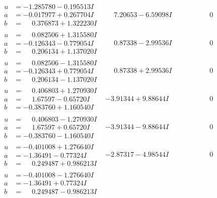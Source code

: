 \documentclass[1p]{elsarticle_modified}
\theoremstyle{definition}
\begin{document}
$$\begin{array}{c|c|c}
\begin{aligned}
u &= -1.285780 - 0.195513 I \\
a &= -0.017977 + 0.267704 I \\
b &= \phantom{-}0.376873 + 1.322230 I\end{aligned}
 & \phantom{-}7.20653 - 6.59098 I & \phantom{-0.000000 } 0 \\ \hline\begin{aligned}
u &= \phantom{-}0.082506 + 1.315580 I \\
a &= -0.126343 - 0.779054 I \\
b &= \phantom{-}0.206134 + 1.137020 I\end{aligned}
 & \phantom{-}0.87338 - 2.99536 I & \phantom{-0.000000 } 0 \\ \hline\begin{aligned}
u &= \phantom{-}0.082506 - 1.315580 I \\
a &= -0.126343 + 0.779054 I \\
b &= \phantom{-}0.206134 - 1.137020 I\end{aligned}
 & \phantom{-}0.87338 + 2.99536 I & \phantom{-0.000000 } 0 \\ \hline\begin{aligned}
u &= \phantom{-}0.406803 + 1.270930 I \\
a &= \phantom{-}1.67597 - 0.65720 I \\
b &= -0.383760 + 1.160540 I\end{aligned}
 & -3.91344 + 9.88644 I & \phantom{-0.000000 } 0 \\ \hline\begin{aligned}
u &= \phantom{-}0.406803 - 1.270930 I \\
a &= \phantom{-}1.67597 + 0.65720 I \\
b &= -0.383760 - 1.160540 I\end{aligned}
 & -3.91344 - 9.88644 I & \phantom{-0.000000 } 0 \\ \hline\begin{aligned}
u &= -0.401008 + 1.276640 I \\
a &= -1.36491 - 0.77324 I \\
b &= \phantom{-}0.249487 + 0.986213 I\end{aligned}
 & -2.87317 - 4.98544 I & \phantom{-0.000000 } 0 \\ \hline\begin{aligned}
u &= -0.401008 - 1.276640 I \\
a &= -1.36491 + 0.77324 I \\
b &= \phantom{-}0.249487 - 0.986213 I\end{aligned}

\end{array}$$
\end{document}
